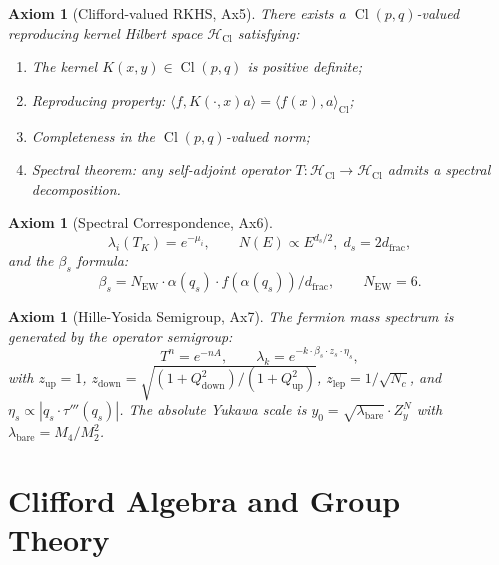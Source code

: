 \documentclass[12pt,a4paper]{article}
\newtheorem{axiom}[theorem]{Axiom}
\newcommand{\Cl}{\operatorname{Cl}}
\newcommand{\HH}{\mathcal{H}}
\begin{document}
\begin{axiom}[Clifford-valued RKHS, Ax5]
There exists a $\Cl(p,q)$-valued reproducing kernel Hilbert space $\HH_{\Cl}$ satisfying:
\begin{enumerate}
  \item The kernel $K(x,y) \in \Cl(p,q)$ is positive definite;
  \item Reproducing property: $\langle f, K(\cdot, x)a \rangle = \langle f(x), a \rangle_{\Cl}$;
  \item Completeness in the $\Cl(p,q)$-valued norm;
  \item Spectral theorem: any self-adjoint operator $T: \HH_{\Cl} \to \HH_{\Cl}$ 
  admits a spectral decomposition.
\end{enumerate}
\end{axiom}

\begin{axiom}[Spectral Correspondence, Ax6]
\begin{equation}
\lambda_i(T_K) = e^{-\mu_i}, \qquad N(E) \propto E^{d_s/2},\; d_s = 2 d_{\text{frac}},
\end{equation}
and the $\beta_s$ formula:
\begin{equation}
\beta_s = N_{\text{EW}} \cdot \alpha(q_s) \cdot f(\alpha(q_s)) / d_{\text{frac}}, 
\qquad N_{\text{EW}} = 6.
\label{eq:beta}
\end{equation}
\end{axiom}

\begin{axiom}[Hille-Yosida Semigroup, Ax7]
The fermion mass spectrum is generated by the operator semigroup:
\begin{equation}
T^n = e^{-nA}, \qquad \lambda_k = e^{-k \cdot \beta_s \cdot z_s \cdot \eta_s},
\label{eq:semigroup}
\end{equation}
with $z_{\text{up}} = 1$, $z_{\text{down}} = \sqrt{(1+Q_{\text{down}}^2)/(1+Q_{\text{up}}^2)}$, 
$z_{\text{lep}} = 1/\sqrt{N_c}$, and $\eta_s \propto |q_s \cdot \tau'''(q_s)|$.
The absolute Yukawa scale is $y_0 = \sqrt{\lambda_{\text{bare}}} \cdot Z_y^N$ 
with $\lambda_{\text{bare}} = M_4/M_2^2$.
\end{axiom}

\section{Clifford Algebra and Group Theory}
\label{sec:clifford}
\end{document}
